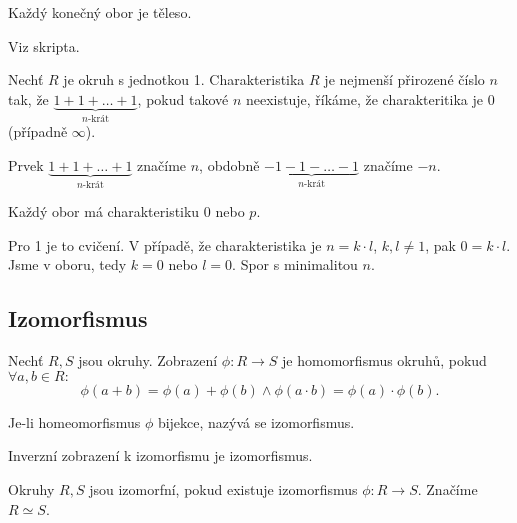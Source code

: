 \documentclass[12pt]{article}                   %
\begin{document}
        \begin{tvrzeni}
            Každý konečný obor je těleso.
            
            \begin{dukazin}
                Viz skripta.
            \end{dukazin}
        \end{tvrzeni}

        \begin{definice}
            Nechť $R$ je okruh s jednotkou 1. Charakteristika $R$ je nejmenší přirozené číslo $n$ tak, že $ \underbrace{1+1+…+1}_{n\text{-krát}}$, pokud takové $n$ neexistuje, říkáme, že charakteritika je 0 (případně $∞$).

            Prvek $\underbrace{1+1+…+1}_{n\text{-krát}}$ značíme $n$, obdobně $\underbrace{-1-1-…-1}_{n\text{-krát}}$ značíme $-n$.
        \end{definice}

        \begin{tvrzeni}
            Každý obor má charakteristiku 0 nebo $p$.

            \begin{dukazin}
                Pro 1 je to cvičení. V případě, že charakteristika je $n = k·l$, $k, l≠1$, pak $0 = k·l$. Jsme v oboru, tedy $k = 0$ nebo $l=0$. Spor s minimalitou $n$.
            \end{dukazin}
        \end{tvrzeni}

    \subsection{Izomorfismus}
        \begin{definice}[Homomorfismus]
            Nechť $R, S$ jsou okruhy. Zobrazení $\phi: R \rightarrow S$ je homomorfismus okruhů, pokud $\forall a, b \in R:$
            $$ \phi(a + b) = \phi(a) + \phi(b) \land \phi(a·b) = \phi(a) · \phi(b). $$

            Je-li homeomorfismus $\phi$ bijekce, nazývá se izomorfismus.
        \end{definice}

        \begin{poznamka}
            Inverzní zobrazení k izomorfismu je izomorfismus.
        \end{poznamka}

        \begin{definice}
            Okruhy $R, S$ jsou izomorfní, pokud existuje izomorfismus $\phi: R \rightarrow S$. Značíme $R \simeq S$.
        \end{definice}
\end{document}
